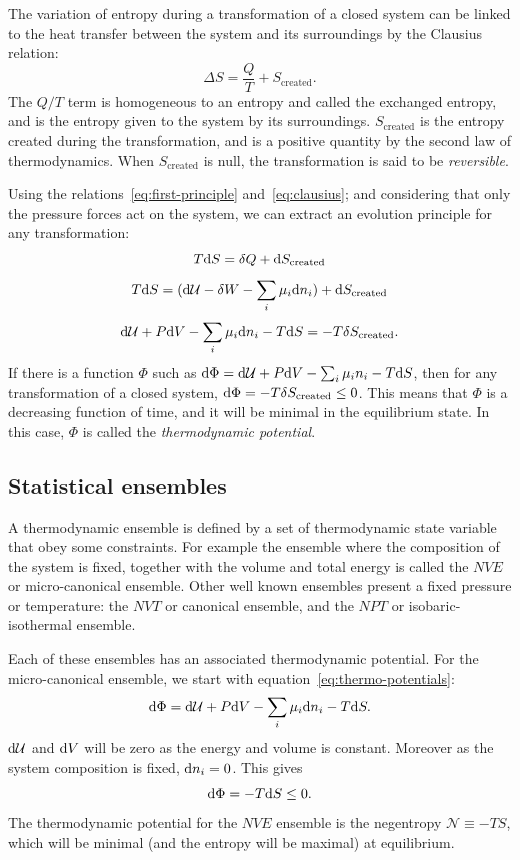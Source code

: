 \documentclass[thesis]{subfiles}
\begin{document}
The variation of entropy during a transformation of a closed system can be
linked to the heat transfer between the system and its surroundings by the
Clausius relation:
\[\Delta S = \frac Q T + S_\text{created}. \label{eq:clausius}\]
The $Q/T$ term is homogeneous to an entropy and called the exchanged entropy,
and is the entropy given to the system by its surroundings. $S_\text{created}$
is the entropy created during the transformation, and is a positive quantity by
the second law of thermodynamics. When $S_\text{created}$ is null, the
transformation is said to be \emph{reversible}.

Using the relations~\eqref{eq:first-principle} and~\eqref{eq:clausius}; and
considering that only the pressure forces act on the system, we can extract an
evolution principle for any transformation:
\[T \text{d} S = \delta Q + \text{d} S_\text{created}\]
\[T \text{d} S = (\text{d} \mathcal{U} - \delta W - \sum_i \mu_i \text{d} n_i) + \text{d} S_\text{created}\]
\[\text{d} \mathcal{U} + P \text{d} V - \sum_i \mu_i \text{d} n_i - T \text{d} S = -T\delta S_\text{created}.\label{eq:thermo-potentials}\]
If there is a function $\Phi$ such as $\text{d} \Phi = \text{d} \mathcal{U} + P \text{d} V - \sum_i \mu_i
n_i - T \text{d} S$, then for any transformation of a closed system, $\text{d} \Phi =
-T\delta S_\text{created} \leq 0$. This means that $\Phi$ is a decreasing
function of time, and it will be minimal in the equilibrium state. In this case,
$\Phi$ is called the \emph{thermodynamic potential}.

\subsection{Statistical ensembles}

A thermodynamic ensemble is defined by a set of thermodynamic state variable
that obey some constraints. For example the ensemble where the composition of
the system is fixed, together with the volume and total energy is called the
$NVE$ or micro-canonical ensemble. Other well known ensembles present a fixed
pressure or temperature: the $NVT$ or canonical ensemble, and the $NPT$ or
isobaric-isothermal ensemble.

Each of these ensembles has an associated thermodynamic potential. For the
micro-canonical ensemble, we start with equation~\eqref{eq:thermo-potentials}:
\[\text{d} \Phi = \text{d} \mathcal{U} + P \text{d} V - \sum_i \mu_i \text{d} n_i - T \text{d} S.\]
$\text{d} \mathcal{U}$ and $\text{d} V$ will be zero as the energy and volume is constant.
Moreover as the system composition is fixed, $\text{d} n_i = 0$. This gives
\[\text{d} \Phi = - T \text{d} S \leq 0.\]
The thermodynamic potential for the $NVE$ ensemble is the negentropy
$\mathcal{N} \equiv -TS$, which will be minimal (and the entropy will be
maximal) at equilibrium.
\end{document}
